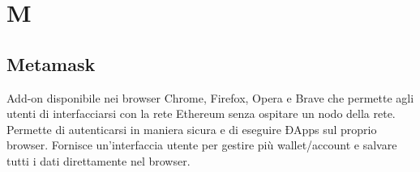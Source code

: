 \section*{M}
\subsection*{Metamask}
Add-on disponibile nei browser Chrome, Firefox, Opera e Brave che permette agli utenti di interfacciarsi con la rete Ethereum senza ospitare un nodo della rete. Permette di autenticarsi in maniera sicura e di eseguire ÐApps sul proprio browser. Fornisce un'interfaccia utente per gestire più wallet/account e salvare tutti i dati direttamente nel browser. 

